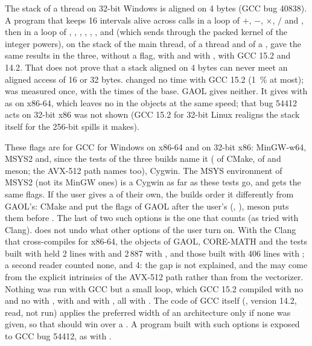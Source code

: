 \medskip
The stack of a thread on 32-bit Windows is aligned on 4 bytes (GCC bug
40838). A program that keeps 16 intervals alive across calls in a loop of
$+$, $-$, $\times$, $/$ and , then in a loop of ,
, , , ,
,  and  (which  sends through the
packed kernel of the integer powers), on the stack of the main thread, of a
 thread and of a , gave the same results
in the three, without a flag, with  and with
, with GCC 15.2 and 14.2. That does
not prove that a stack aligned on 4 bytes can never meet an aligned access of
16 or 32 bytes.  changed no time with GCC 15.2 (1~\%
at most);  was measured once, with the
times of the base. GAOL gives neither. It gives
 with  as on x86-64, which
leaves no  in the objects at the same speed; that bug 54412 acts
on 32-bit x86 was not shown (GCC 15.2 for 32-bit Linux realigns the stack
itself for the 256-bit spills it makes).

\medskip
These flags are for GCC for Windows on x86-64 and on 32-bit x86: MinGW-w64,
MSYS2 and, since the tests of the three builds name it ( of
CMake,  of  and meson; the AVX-512 path
names  too), Cygwin.\newinvfive{} The MSYS environment of MSYS2 (not its MinGW ones) is a
Cygwin as far as these tests go, and gets the same flags. If the user gives a
 of their own, the builds order it differently
from GAOL's: CMake and  put the flags of GAOL after the user's
(, ), meson puts them before
. The last of two such options is the one that counts (as
tried with Clang).  does not undo what
other options of the user turn on. With the Clang that cross-compiles for
x86-64, the objects of GAOL, CORE-MATH and the tests built with
 held 2 lines with
 and 2\,887 with , and those built with
 406 lines with
; a second reader counted none, and 4: the gap is not explained,
and the  may come from the explicit intrinsics of the AVX-512 path
rather than from the vectorizer. Nothing was run with GCC but a small loop,
which GCC 15.2 compiled with no  and no  with
, with  and with
, all with . The code
of GCC itself (, version 14.2, read,
not run) applies the preferred width of an architecture only if none was
given, so that  should win over a
. A program built with such options is exposed to GCC bug
54412, as with .

